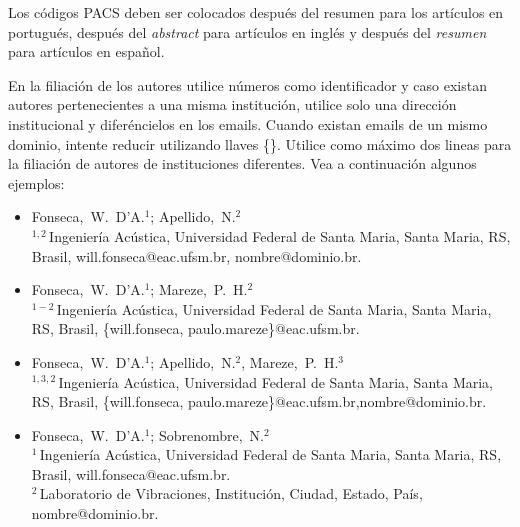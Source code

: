 \documentclass[12pt, a4paper, twoside, twocolumn]{article}
\begin{document}
Los códigos PACS deben ser colocados después del resumen para los artículos en portugués, después del \textit{abstract} para artículos en inglés y después del \textit{resumen} para artículos en español.

En la filiación de los autores utilice números como identificador y caso existan autores pertenecientes a una misma institución, utilice solo una dirección institucional y diferéncielos en los emails. Cuando existan emails de un mismo dominio, intente reducir utilizando llaves \{\}. Utilice como máximo dos lineas para la filiación de autores de instituciones diferentes. Vea a continuación algunos ejemplos:
%
\begin{flushleft}
\vspace{-0.5\baselineskip}
\begin{itemize}[topsep=-1ex,align=left,leftmargin=0.2cm] \itemsep=4pt

	\item Fonseca,~W.~D'A.$^1$; Apellido,~N.$^2$\\[6pt]	
	$^{1,2}$\,Ingeniería Acústica, Universidad Federal de Santa Maria, Santa Maria, RS, Brasil,\linebreak 
	 will.fonseca@eac.ufsm.br, nombre@dominio.br.
	
	\item Fonseca,~W.~D'A.$^1$; Mareze,~P.~H.$^2$\\[6pt]	
	$^{1-2}$\,Ingeniería Acústica, Universidad Federal de Santa Maria, Santa Maria, RS, Brasil,
	\{will.fonseca, paulo.mareze\}@eac.ufsm.br.
	
	\item Fonseca,~W.~D'A.$^1$; Apellido,~N.$^2$, Mareze,~P.~H.$^3$\\[6pt]	
	$^{1,3,2}$\,Ingeniería  Acústica, Universidad Federal de Santa Maria, Santa Maria, RS, Brasil,
	\{will.fonseca, paulo.mareze\}@eac.ufsm.br,\linebreak nombre@dominio.br.

	\item Fonseca,~W.~D'A.$^1$; Sobrenombre,~N.$^2$\\[6pt]	
	$^{1}$\,Ingeniería  Acústica, Universidad Federal de Santa Maria, Santa Maria, RS, Brasil,
	will.fonseca@eac.ufsm.br.\\[4pt]		
	$^2$\,Laboratorio de Vibraciones, Institución, Ciudad, Estado, País, nombre@dominio.br.	
\end{itemize}
\vspace{-0.4\baselineskip}
\end{flushleft}
\end{document}
